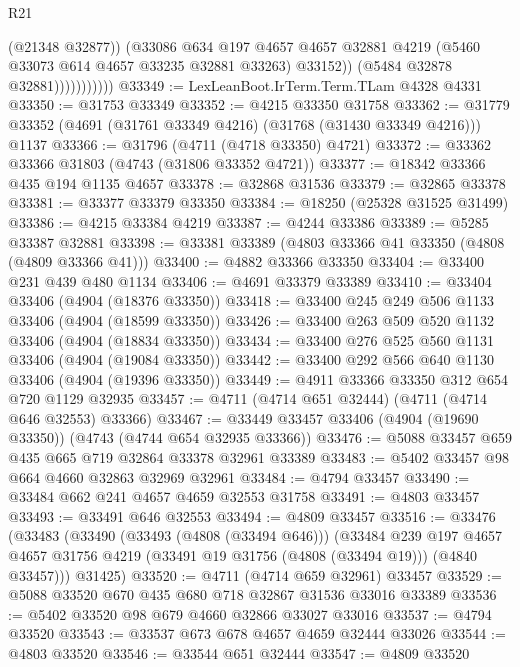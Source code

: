 \begin{lexlean}{R21}
\begin{coremodule}
                            (@21348 @32877))
                          (@33086
                            @634
                            @197
                            @4657
                            @4657
                            @32881
                            @4219
                            (@5460 @33073 @614 @4657 @33235 @32881 @33263)
                            @33152))
                        (@5484 @32878 @32881)))))))))))
@33349 := LexLeanBoot.IrTerm.Term.TLam @4328 @4331
@33350 := @31753 @33349
@33352 := @4215 @33350 @31758
@33362 := @31779 @33352 (@4691 (@31761 @33349 @4216) (@31768 (@31430 @33349 @4216))) @1137
@33366 := @31796 (@4711 (@4718 @33350) @4721)
@33372 := @33362 @33366 @31803 (@4743 (@31806 @33352 @4721))
@33377 := @18342 @33366 @435 @194 @1135 @4657
@33378 := @32868 @31536
@33379 := @32865 @33378
@33381 := @33377 @33379 @33350
@33384 := @18250 (@25328 @31525 @31499)
@33386 := @4215 @33384 @4219
@33387 := @4244 @33386
@33389 := @5285 @33387 @32881
@33398 := @33381 @33389 (@4803 @33366 @41 @33350 (@4808 (@4809 @33366 @41)))
@33400 := @4882 @33366 @33350
@33404 := @33400 @231 @439 @480 @1134
@33406 := @4691 @33379 @33389
@33410 := @33404 @33406 (@4904 (@18376 @33350))
@33418 := @33400 @245 @249 @506 @1133 @33406 (@4904 (@18599 @33350))
@33426 := @33400 @263 @509 @520 @1132 @33406 (@4904 (@18834 @33350))
@33434 := @33400 @276 @525 @560 @1131 @33406 (@4904 (@19084 @33350))
@33442 := @33400 @292 @566 @640 @1130 @33406 (@4904 (@19396 @33350))
@33449 := @4911 @33366 @33350 @312 @654 @720 @1129 @32935
@33457 := @4711 (@4714 @651 @32444) (@4711 (@4714 @646 @32553) @33366)
@33467 := @33449 @33457 @33406 (@4904 (@19690 @33350)) (@4743 (@4744 @654 @32935 @33366))
@33476 := @5088 @33457 @659 @435 @665 @719 @32864 @33378 @32961 @33389
@33483 := @5402 @33457 @98 @664 @4660 @32863 @32969 @32961
@33484 := @4794 @33457
@33490 := @33484 @662 @241 @4657 @4659 @32553 @31758
@33491 := @4803 @33457
@33493 := @33491 @646 @32553
@33494 := @4809 @33457
@33516 := @33476
    (@33483
      (@33490
        (@33493 (@4808 (@33494 @646)))
        (@33484
          @239
          @197
          @4657
          @4657
          @31756
          @4219
          (@33491 @19 @31756 (@4808 (@33494 @19)))
          (@4840 @33457)))
      @31425)
@33520 := @4711 (@4714 @659 @32961) @33457
@33529 := @5088 @33520 @670 @435 @680 @718 @32867 @31536 @33016 @33389
@33536 := @5402 @33520 @98 @679 @4660 @32866 @33027 @33016
@33537 := @4794 @33520
@33543 := @33537 @673 @678 @4657 @4659 @32444 @33026
@33544 := @4803 @33520
@33546 := @33544 @651 @32444
@33547 := @4809 @33520

\end{coremodule}
\end{lexlean}
